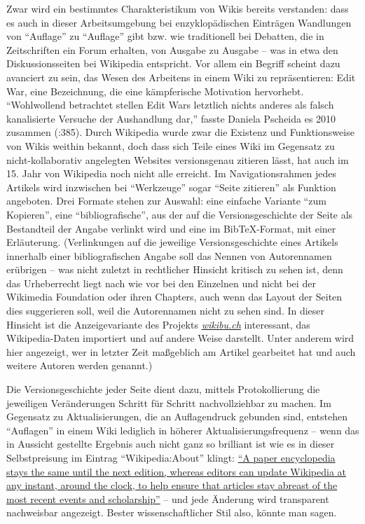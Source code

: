 \documentclass[fontsize=12pt]{scrartcl}
\begin{document}
Zwar wird ein be\-stimmtes Charakteristikum von Wikis bereits verstanden: dass es auch in dieser Arbeitsumgebung bei enzyklop\"adischen Eintr\"agen Wandlungen von "`Auflage"' zu "`Auflage"' gibt bzw. wie traditionell bei Debatten, die in Zeitschriften ein Forum erhalten, von Ausgabe zu Ausgabe -- was in etwa den Dis\-kus\-si\-onssei\-ten bei Wi\-ki\-pe\-dia entspricht. Vor allem ein Begriff scheint dazu avanciert zu sein, das Wesen des Arbei\-tens in einem Wiki zu repr\"asentieren: Edit War, eine Be\-zeichnung, die eine k\"ampferische Motivation hervorhebt. "`Wohlwollend betrachtet stellen Edit Wars letzt\-lich nichts anderes als falsch kanalisierte Versuche der Aushandlung dar,"' fasste Daniela Pscheida es 2010 zusammen (\cite{Pscheida2010}:385). Durch Wi\-ki\-pe\-dia wurde zwar die Existenz und Funktionsweise von Wikis weithin bekannt, doch dass sich Teile eines Wiki im Gegensatz zu nicht-kollaborativ angelegten Websites versionsgenau zitieren l\"asst, hat auch im 15. Jahr von Wi\-ki\-pe\-dia noch nicht alle erreicht. Im Navigationsrahmen jedes Artikels wird inzwischen bei "`Werkzeuge"' sogar "`Seite zitieren"' als Funktion angeboten. Drei Formate stehen zur Auswahl: eine einfache Variante "`zum Kopieren"', eine "`bibliografische"', aus der auf die Versionsgeschichte der Seite als Bestandteil der Angabe verlinkt wird und eine im BibTeX-Format, mit einer Erl\"auterung. (Verlinkungen auf die jeweilige Versionsgeschichte eines Artikels innerhalb einer bibliografischen Angabe soll das Nennen von Autoren\textsuperscript{\tiny *}namen er\"ubrigen -- was nicht zu\-letzt in recht\-li\-cher Hinsicht kritisch zu sehen ist, denn das Urheberrecht liegt nach wie vor bei den Einzelnen und nicht bei der Wikimedia Foundation oder ihren Chapters, auch wenn das Layout der Sei\-ten dies suggerieren soll, weil die Autoren\textsuperscript{\tiny *}namen nicht zu sehen sind. In dieser Hinsicht ist die Anzeigevariante des Projekts \href{http://wikibu.ch}{\textit{wikibu.ch}} interessant, das Wi\-ki\-pe\-dia-Daten importiert und auf andere Weise darstellt. Unter anderem wird \mbox{hier} angezeigt, wer in letzter Zeit ma{\ss}geblich am Artikel gearbeitet hat und auch weitere Autoren\textsuperscript{\tiny *} werden genannt.) 

Die Versionsgeschichte jeder Seite dient dazu, mittels Protokollierung die jeweiligen Ver\"anderungen Schritt f\"ur Schritt nachvollziehbar zu machen. Im Gegensatz zu Aktualisierungen, die an Auflagendruck gebunden sind, entstehen "`Auflagen"' in einem Wiki lediglich in h\"oherer Aktualisierungsfrequenz -- wenn das in Aussicht gestellte Ergebnis auch nicht ganz so brilliant ist wie es in dieser Selbst\-preisung im Eintrag "`Wikipedia:About"' klingt: \href{https://en.wikipedia.org/w/index.php?title=Wikipedia:About\&oldid=642064642\#Wikipedia_vs_paper_encyclopedias}{"`A paper encyclopedia stays the same until the next edition, whereas editors can update Wi\-ki\-pe\-dia at any instant, around the clock, to help ensure that articles stay abreast of the most recent events and scholarship"'} -- und jede \"Anderung wird transparent nachweisbar angezeigt. Bester wissenschaftlicher Stil also, k\"onnte man sagen. 
\end{document}
